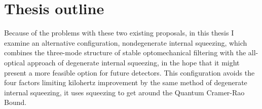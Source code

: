 \section{Thesis outline}


Because of the problems with these two existing proposals, in this thesis I examine an alternative configuration, nondegenerate internal squeezing, which combines the three-mode structure of stable optomechanical filtering with the all-optical approach of degenerate internal squeezing, in the hope that it might present a more feasible option for future detectors. This configuration avoids the four factors limiting kilohertz improvement by the same method of degenerate internal squeezing, it uses squeezing to get around the Quantum Cramer-Rao Bound.






